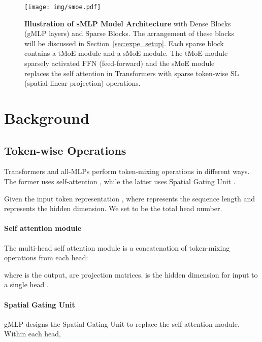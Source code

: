 \documentclass{article}
\begin{document}
\begin{figure*}
    \centering
    \texttt{[image: img/smoe.pdf]}
\caption{\textbf{Illustration of sMLP Model Architecture} with  Dense Blocks (gMLP layers) and  Sparse Blocks. The arrangement of these blocks will be discussed in Section~\ref{sec:expe_setup}.
    Each sparse block contains a tMoE module and a sMoE module. The tMoE module sparsely activated FFN (feed-forward) and the sMoE module replaces the self attention in Transformers with sparse token-wise SL (spatial linear projection) operations.}
\label{fig:model_frames}
\end{figure*}
 \section{Background}
\label{sec:background}


\subsection{Token-wise Operations}





Transformers and all-MLPs perform token-mixing operations in different ways. The former uses self-attention \citep{vaswani2017attention}, while the latter uses Spatial Gating Unit \citep{gmlp}.

Given the input token representation , where  represents the sequence length and  represents the hidden dimension. We set  to be the total head number. 





\vspace{-2mm}
\paragraph{Self attention module}
The multi-head self attention module is a concatenation of token-mixing operations from each head:

where  is the output,  are projection matrices.  is the hidden dimension for input to a single head .






\vspace{-2mm}
\paragraph{Spatial Gating Unit}
gMLP \citep{gmlp} designs the Spatial Gating Unit to replace the self attention module. Within each head, 
\end{document}
